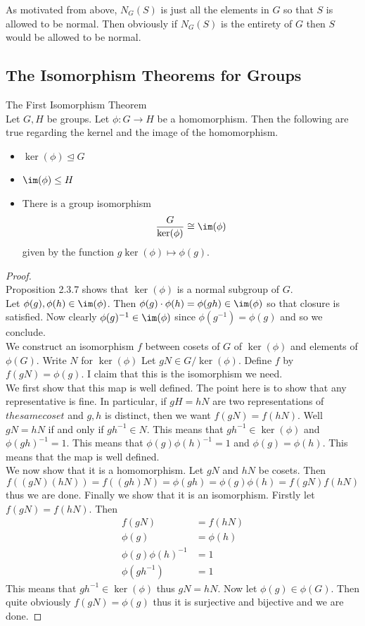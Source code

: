 \documentclass[a4paper]{article}
\begin{document}
As motivated from above, $N_G(S)$ is just all the elements in $G$ so that $S$ is allowed to be normal. Then obviously if $N_G(S)$ is the entirety of $G$ then $S$ would be allowed to be normal. 

\subsection{The Isomorphism Theorems for Groups}
\begin{thm}{The First Isomorphism Theorem}{}\\
Let $G,H$ be groups. Let $\phi:G\to H$ be a homomorphism. Then the following are true regarding the kernel and the image of the homomorphism. 
\begin{itemize}
\item $\ker(\phi)\trianglelefteq G$
\item $\im(\phi)\leq H$
\item There is a group isomorphism $$\frac{G}{\ker(\phi)}\cong\im(\phi)$$ given by the function $g\ker(\phi)\mapsto\phi(g)$. 
\end{itemize} 
\begin{proof}\\
Proposition 2.3.7 shows that $\ker(\phi)$ is a normal subgroup of $G$. \\

Let $\phi(g),\phi(h)\in\im(\phi)$. Then $\phi(g)\cdot\phi(h)=\phi(gh)\in\im(\phi)$ so that closure is satisfied. Now clearly $\phi(g)^{-1}\in\im(\phi)$ since $\phi(g^{-1})=\phi(g)$ and so we conclude. \\

We construct an isomorphism $f$ between cosets of $G$ of $\ker(\phi)$ and elements of $\phi(G)$. Write $N$ for $\ker(\phi)$ Let $gN\in G/\ker(\phi)$. Define $f$ by $f(gN)=\phi(g)$. I claim that this is the isomorphism we need. \\
We first show that this map is well defined. The point here is to show that any representative is fine. In particular, if $gH=hN$ are two representations of $the same coset$ and $g,h$ is distinct, then we want $f(gN)=f(hN)$. Well $gN=hN$ if and only if $gh^{-1}\in N$. This means that $gh^{-1}\in\ker(\phi)$ and $\phi(gh)^{-1}=1$. This means that $\phi(g)\phi(h)^{-1}=1$ and $\phi(g)=\phi(h)$. This means that the map is well defined. \\
We now show that it is a homomorphism. Let $gN$ and $hN$ be cosets. Then $$f((gN)(hN))=f((gh)N)=\phi(gh)=\phi(g)\phi(h)=f(gN)f(hN)$$ thus we are done. Finally we show that it is an isomorphism. Firstly let $f(gN)=f(hN)$. Then
\begin{align*}
f(gN)&=f(hN)\\
\phi(g)&=\phi(h)\\
\phi(g)\phi(h)^{-1}&=1\\
\phi(gh^{-1})&=1
\end{align*}
This means that $gh^{-1}\in\ker(\phi)$ thus $gN=hN$. Now let $\phi(g)\in\phi(G)$. Then quite obviously $f(gN)=\phi(g)$ thus it is surjective and bijective and we are done. 
\end{proof}
\end{thm}
\end{document}
